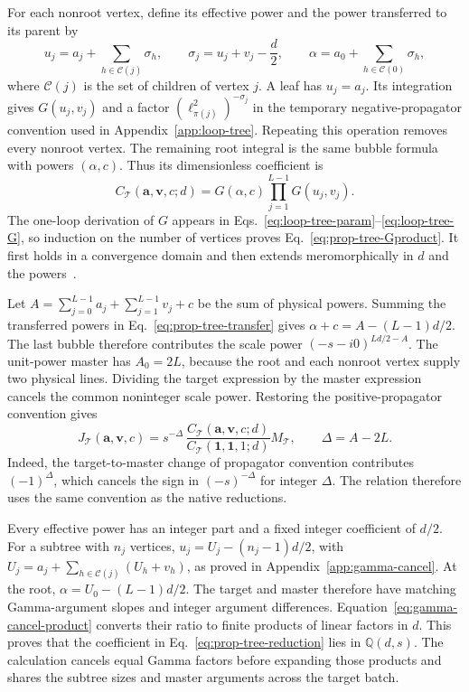 For each nonroot vertex, define its effective power and the power transferred to its parent by
\begin{equation}
 u_j=a_j+\sum_{h\in\mathcal C(j)}\sigma_h,
 \qquad \sigma_j=u_j+v_j-\frac d2,
 \qquad \alpha=a_0+\sum_{h\in\mathcal C(0)}\sigma_h,
 \label{eq:prop-tree-transfer}
\end{equation}
where $\mathcal C(j)$ is the set of children of vertex $j$. A leaf has $u_j=a_j$. Its integration gives $G(u_j,v_j)$ and a factor $(\ell_{\pi(j)}^2)^{-\sigma_j}$ in the temporary negative-propagator convention used in Appendix~\ref{app:loop-tree}. Repeating this operation removes every nonroot vertex. The remaining root integral is the same bubble formula with powers $(\alpha,c)$. Thus its dimensionless coefficient is
\begin{equation}
 C_{\mathcal T}(\boldsymbol a,\boldsymbol v,c;d)
 =G(\alpha,c)\prod_{j=1}^{L-1}G(u_j,v_j).
 \label{eq:prop-tree-Gproduct}
\end{equation}
The one-loop derivation of $G$ appears in Eqs.~\eqref{eq:loop-tree-param}--\eqref{eq:loop-tree-G}, so induction on the number of vertices proves Eq.~\eqref{eq:prop-tree-Gproduct}. It first holds in a convergence domain and then extends meromorphically in $d$ and the powers~\cite{Weinzierl2022}.

Let $A=\sum_{j=0}^{L-1}a_j+\sum_{j=1}^{L-1}v_j+c$ be the sum of physical powers. Summing the transferred powers in Eq.~\eqref{eq:prop-tree-transfer} gives $\alpha+c=A-(L-1)d/2$. The last bubble therefore contributes the scale power $(-s-i0)^{Ld/2-A}$. The unit-power master has $A_0=2L$, because the root and each nonroot vertex supply two physical lines. Dividing the target expression by the master expression cancels the common noninteger scale power. Restoring the positive-propagator convention gives
\begin{equation}
 J_{\mathcal T}(\boldsymbol a,\boldsymbol v,c)
 =s^{-\Delta}\,
 \frac{C_{\mathcal T}(\boldsymbol a,\boldsymbol v,c;d)}
 {C_{\mathcal T}(\boldsymbol 1,\boldsymbol 1,1;d)}
 M_{\mathcal T},
 \qquad \Delta=A-2L.
 \label{eq:prop-tree-reduction}
\end{equation}
Indeed, the target-to-master change of propagator convention contributes $(-1)^\Delta$, which cancels the sign in $(-s)^{-\Delta}$ for integer $\Delta$. The relation therefore uses the same convention as the native reductions.

Every effective power has an integer part and a fixed integer coefficient of $d/2$. For a subtree with $n_j$ vertices, $u_j=U_j-(n_j-1)d/2$, with $U_j=a_j+\sum_{h\in\mathcal C(j)}(U_h+v_h)$, as proved in Appendix~\ref{app:gamma-cancel}. At the root, $\alpha=U_0-(L-1)d/2$. The target and master therefore have matching Gamma-argument slopes and integer argument differences. Equation~\eqref{eq:gamma-cancel-product} converts their ratio to finite products of linear factors in $d$. This proves that the coefficient in Eq.~\eqref{eq:prop-tree-reduction} lies in $\mathbb Q(d,s)$. The calculation cancels equal Gamma factors before expanding those products and shares the subtree sizes and master arguments across the target batch.

